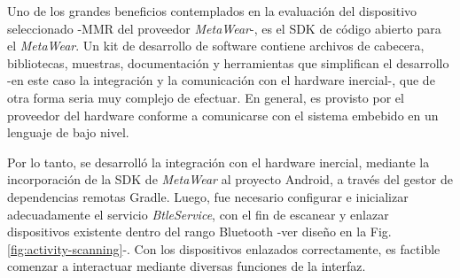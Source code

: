 Uno de los grandes beneficios contemplados en la evaluación del dispositivo seleccionado -MMR del proveedor \textit{MetaWear}-, es el SDK de código abierto para el \textit{MetaWear}. Un kit de desarrollo de software contiene archivos de cabecera, bibliotecas, muestras, documentación y herramientas que simplifican el desarrollo -en este caso la integración y la comunicación con el hardware inercial-, que de otra forma seria muy complejo de efectuar. En general, es provisto por el proveedor del hardware conforme a comunicarse con el sistema embebido en un lenguaje de bajo nivel. 

Por lo tanto, se desarrolló la integración con el hardware inercial, mediante la incorporación de la SDK de \textit{MetaWear} al proyecto Android, a través del gestor de dependencias remotas \gls{Gradle}. Luego, fue necesario configurar e inicializar adecuadamente el servicio \textit{BtleService}, con el fin de escanear y enlazar dispositivos existente dentro del rango Bluetooth -ver diseño en la Fig. \ref{fig:activity-scanning}-. Con los dispositivos enlazados correctamente, es factible comenzar a interactuar mediante diversas funciones de la interfaz. 

